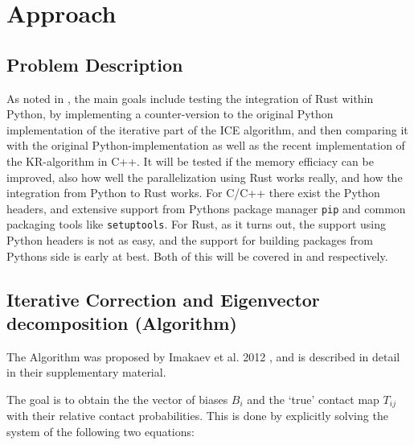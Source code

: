 \chapter{Approach}\label{chap:approach}



\section{Problem Description}\label{sec:problem}

As noted in , the main goals include testing the integration
of Rust within Python, by implementing a counter-version to the original Python
implementation of the iterative part of the ICE algorithm, and then comparing
it with the original Python-implementation as well as the recent implementation
of the KR-algorithm in C++. It will be tested if the memory efficiacy can be
improved, also how well the parallelization using Rust works really, and how
the integration from Python to Rust works. For C/C++ there exist the Python
headers, and extensive support from Pythons package manager \verb|pip| and
common packaging tools like \verb|setuptools|. For Rust, as it turns out, the
support using Python headers is not as easy, and the support for building packages
from Pythons side is early at best. Both of this will be covered in
 and  respectively.





\section{Iterative Correction and Eigenvector decomposition (Algorithm)}\label{sec:ICE}

The Algorithm was proposed by Imakaev et al. 2012 \cite{imakaev2012iterative},
and is described in detail in their supplementary material.

The goal is to obtain the the vector of biases $B_i$ and the `true' contact map
$T_{ij}$ with their relative contact probabilities. This is done by explicitly
solving the system of the following two equations:

